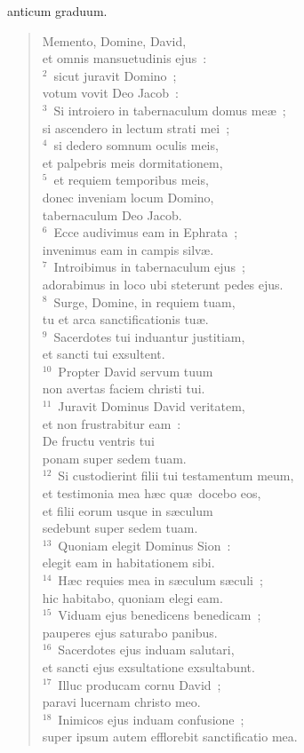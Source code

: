 \bchapter[Psalm]
anticum graduum. \begin{verse}Memento, Domine, David,\\ et omnis mansuetudinis ejus~:\\
${}^{2}$~sicut juravit Domino~;\\ votum vovit Deo Jacob~:\\
${}^{3}$~Si introiero in tabernaculum domus me\ae~;\\ si ascendero in lectum strati mei~;\\
${}^{4}$~si dedero somnum oculis meis,\\ et palpebris meis dormitationem,\\
${}^{5}$~et requiem temporibus meis,\\ donec inveniam locum Domino,\\ tabernaculum Deo Jacob.\\
${}^{6}$~Ecce audivimus eam in Ephrata~;\\ invenimus eam in campis silv\ae .\\
${}^{7}$~Introibimus in tabernaculum ejus~;\\ adorabimus in loco ubi steterunt pedes ejus.\\
${}^{8}$~Surge, Domine, in requiem tuam,\\ tu et arca sanctificationis tu\ae .\\
${}^{9}$~Sacerdotes tui induantur justitiam,\\ et sancti tui exsultent.\\
${}^{10}$~Propter David servum tuum\\ non avertas faciem christi tui.\\
${}^{11}$~Juravit Dominus David veritatem,\\ et non frustrabitur eam~:\\ De fructu ventris tui\\ ponam super sedem tuam.\\
${}^{12}$~Si custodierint filii tui testamentum meum,\\ et testimonia mea h\ae c qu\ae\ docebo eos,\\ et filii eorum usque in s\ae culum\\ sedebunt super sedem tuam.\\
${}^{13}$~Quoniam elegit Dominus Sion~:\\ elegit eam in habitationem sibi.\\
${}^{14}$~H\ae c requies mea in s\ae culum s\ae culi~;\\ hic habitabo, quoniam elegi eam.\\
${}^{15}$~Viduam ejus benedicens benedicam~;\\ pauperes ejus saturabo panibus.\\
${}^{16}$~Sacerdotes ejus induam salutari,\\ et sancti ejus exsultatione exsultabunt.\\
${}^{17}$~Illuc producam cornu David~;\\ paravi lucernam christo meo.\\
${}^{18}$~Inimicos ejus induam confusione~;\\ super ipsum autem efflorebit sanctificatio mea.\end{verse}
